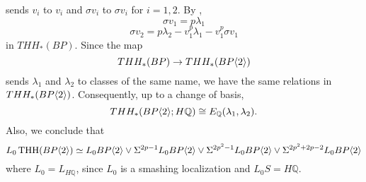 sends $v_i$ to $v_i$ and $\sigma v_i$ to $\sigma v_i$ for $i=1,2$. By \cite[Thm. 1.1]{Rog19}, 
\[ \sigma v_1=p\lambda_1 \]
\[\sigma v_2=p\lambda_2-v_1^p\lambda_1-v_1^{p}\sigma v_1\]
in $THH_*(BP)$. Since the map 
\[ THH_*(BP)\to THH_*(BP\langle 2 \rangle)\]
sends $\lambda_1$ and $\lambda_2$ to classes of the same name, we have the same relations in $THH_*(BP\langle 2 \rangle)$. 
Consequently, up to a change of basis,
\begin{equation}\label{Qcoeff} THH_*(BP\langle 2 \rangle;H\mathbb{Q})\cong E_{\mathbb{Q}}(\lambda_1,\lambda_2). \end{equation}
Also, we conclude that 
\[ L_0 \operatorname{THH}(BP\langle 2 \rangle)\simeq L_0BP\langle 2 \rangle\vee \Sigma^{2p-1}L_0BP\langle 2 \rangle\vee \Sigma^{2p^2-1}L_0BP\langle 2 \rangle\vee\Sigma^{2p^2+2p-2}L_0BP\langle 2 \rangle\]
where $L_0=L_{H\mathbb{Q}}$, since $L_0$ is a smashing localization and $L_0S=H\mathbb{Q}$. 

